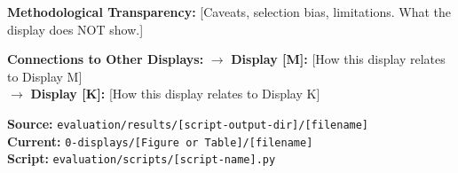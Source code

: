 \textbf{Methodological Transparency:}
[Caveats, selection bias, limitations. What the display does NOT show.]

\textbf{Connections to Other Displays:}
$\rightarrow$ \textbf{Display [M]:} [How this display relates to Display M]\\
$\rightarrow$ \textbf{Display [K]:} [How this display relates to Display K]

\textbf{Source:} \texttt{evaluation/results/[script-output-dir]/[filename]}\\
\textbf{Current:} \texttt{0-displays/[Figure or Table]/[filename]}\\
\textbf{Script:} \texttt{evaluation/scripts/[script-name].py}
